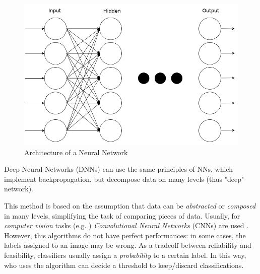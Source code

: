 \begin{figure}[htpb]
\centering
    \includegraphics[scale=0.28]{../img/nn}
    \caption{Architecture of a Neural Network}
    \label{fig:nn}
\end{figure}

Deep Neural Networks (DNNs) can use the same principles of NNs, which implement 
backpropagation, but decompose data on many levels (thus "deep" network).

This method is based on the assumption that data can be \textit{abstracted} or 
\textit{composed} in many levels, simplifying the task of comparing pieces of 
data.
Usually, for \textit{computer vision} tasks (e.g. \cite{Handwritten}) 
\textit{Convolutional Neural Networks} (CNNs) are used \cite{CNN}.
However, this algorithms do not have perfect performances: in some cases, the 
labels assigned to an image may be wrong. As a tradeoff between reliability and 
feasibility, classifiers usually assign a \textit{probability} to a certain label. 
In this way, who uses the algorithm can decide a threshold to 
keep/discard classifications. 
